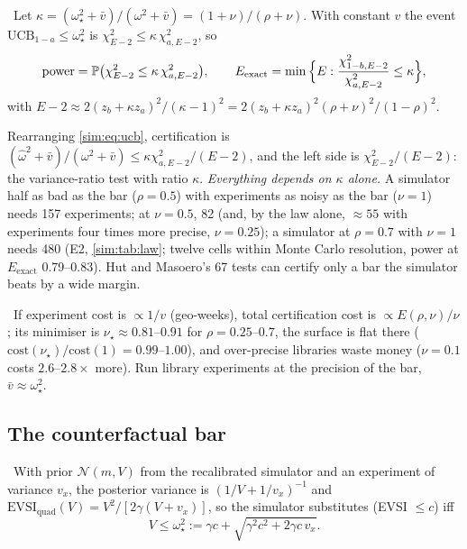 \begin{law}
\label{sim:law:cert}
\tagEstablished\ Let $\kappa = (\omega_\star^2 + \bar v)/(\omega^2 + \bar v) = (1 + \nu)/(\rho + \nu)$. With constant $v$ the event $\mathrm{UCB}_{1-a} \le \omega_\star^2$ is $\chi^2_{E-2} \le \kappa\,\chi^2_{a,E-2}$, so
\begin{equation}
\text{power} = \mathbb{P}\big(\chi^2_{E-2} \le \kappa\,\chi^2_{a, E-2}\big), \qquad
E_{\mathrm{exact}} = \min\Big\{E : \frac{\chi^2_{1-b, E-2}}{\chi^2_{a, E-2}} \le \kappa\Big\},
\label{sim:eq:law}
\end{equation}
with $E - 2 \approx 2(z_b + \kappa z_a)^2/(\kappa - 1)^2 = 2(z_b + \kappa z_a)^2(\rho + \nu)^2/(1 - \rho)^2$.
\end{law}

Rearranging \cref{sim:eq:ucb}, certification is $(\hat\omega^2 + \bar v)/(\omega^2 + \bar v) \le \kappa\chi^2_{a,E-2}/(E-2)$, and the left side is $\chi^2_{E-2}/(E-2)$: the variance-ratio test with ratio $\kappa$. \emph{Everything depends on $\kappa$ alone.} A simulator half as bad as the bar ($\rho = 0.5$) with experiments as noisy as the bar ($\nu = 1$) needs 157 experiments; at $\nu = 0.5$, 82 (and, by the law alone, $\approx 55$ with experiments four times more precise, $\nu = 0.25$); a simulator at $\rho = 0.7$ with $\nu = 1$ needs 480 (E2, \cref{sim:tab:law}; twelve cells within Monte Carlo resolution, power at $E_{\mathrm{exact}}$ 0.79--0.83). Hut and Masoero's 67 tests can certify only a bar the simulator beats by a wide margin.

\begin{corollary}
\label{sim:cor:precision}
\tagNumerical\ If experiment cost is $\propto 1/v$ (geo-weeks), total certification cost is $\propto E(\rho, \nu)/\nu$; its minimiser is $\nu_\star \approx 0.81$--$0.91$ for $\rho = 0.25$--$0.7$, the surface is flat there ($\mathrm{cost}(\nu_\star)/\mathrm{cost}(1) = 0.99$--$1.00$), and over-precise libraries waste money ($\nu = 0.1$ costs $2.6$--$2.8\times$ more). Run library experiments at the precision of the bar, $\bar v \approx \omega_\star^2$.
\end{corollary}

\subsection{The counterfactual bar}

\begin{theorem}
\label{sim:thm:bar}
\tagEstablished\ With prior $\mathcal N(m, V)$ from the recalibrated simulator and an experiment of variance $v_x$, the posterior variance is $(1/V + 1/v_x)^{-1}$ and $\mathrm{EVSI}_{\mathrm{quad}}(V) = V^2/[2\gamma(V + v_x)]$, so the simulator substitutes (EVSI $\le c$) iff
\begin{equation}
V \le \omega_\star^2 := \gamma c + \sqrt{\gamma^2 c^2 + 2\gamma c\, v_x}.
\label{sim:eq:bar}
\end{equation}
\end{theorem}

